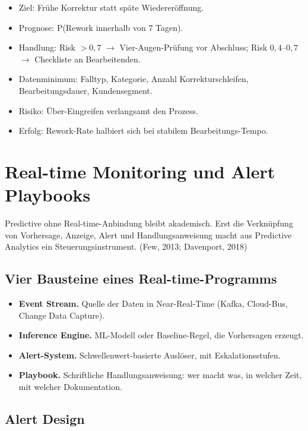 \documentclass[11pt,a4paper,oneside]{article}
\newcommand{\fachbegriff}[1]{\textbf{#1}}
\newcommand{\quelle}[1]{{\footnotesize\color{lpGray}(#1)}}
\begin{document}
\begin{itemize}
  \item Ziel: Frühe Korrektur statt späte Wiedereröffnung.
  \item Prognose: P(Rework innerhalb von 7 Tagen).
  \item Handlung: Risk $>0,7$ $\rightarrow$ Vier-Augen-Prüfung vor Abschluss; Risk $0,4$--$0,7$ $\rightarrow$ Checkliste an Bearbeitenden.
  \item Datenminimum: Falltyp, Kategorie, Anzahl Korrekturschleifen, Bearbeitungsdauer, Kunden\-segment.
  \item Risiko: Über-Eingreifen verlangsamt den Prozess.
  \item Erfolg: Rework-Rate halbiert sich bei stabilem Bearbeitungs-Tempo.
\end{itemize}

\section{Real-time Monitoring und Alert Playbooks}

Predictive ohne Real-time-Anbindung bleibt akademisch. Erst die Verknüpfung von Vorhersage, Anzeige, Alert und Handlungsanweisung macht aus Predictive Analytics ein Steuerungsinstrument. \quelle{Few, 2013; Davenport, 2018}

\subsection{Vier Bausteine eines Real-time-Programms}

\begin{itemize}
  \item \fachbegriff{Event Stream.} Quelle der Daten in Near-Real-Time (Kafka, Cloud-Bus, Change Data Capture).
  \item \fachbegriff{Inference Engine.} ML-Modell oder Baseline-Regel, die Vorhersagen erzeugt.
  \item \fachbegriff{Alert-System.} Schwellenwert-basierte Auslöser, mit Eskalationsstufen.
  \item \fachbegriff{Playbook.} Schriftliche Handlungsanweisung: wer macht was, in welcher Zeit, mit welcher Dokumentation.
\end{itemize}

\subsection{Alert Design}
\end{document}
